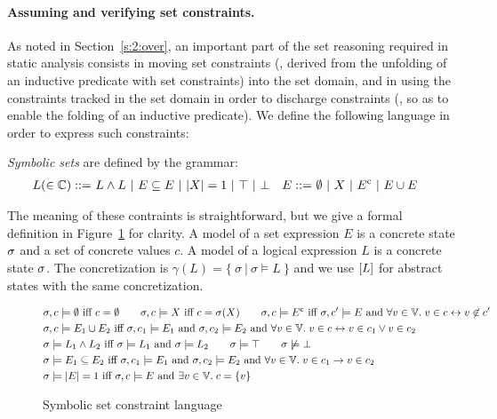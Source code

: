 \paragraph{Assuming and verifying set constraints.}
As noted in Section~\ref{s:2:over}, an important part of the set reasoning
required in static analysis consists in moving set constraints (\eg, derived
from the unfolding of an inductive predicate with set constraints) into the
set domain, and in using the constraints tracked in the set domain in order
to discharge constraints (\eg, so as to enable the folding of an inductive
predicate).
We define the following language in order to express such constraints:
\begin{definition}
  \label{d:1:symsets}
  {\em Symbolic sets} are defined by the grammar:
  \begin{align*}
    L (\in \mathbb{C}) ::=
    & \ L \wedge L \
    | \ E \subseteq E \
    | \ |{X}| = 1 \
    | \ \top \
    | \ \bot
    & E ::=
    & \ \emptyset \ | \ X \ | \ {E}^{\mathrm{c}} \ | \ E \cup E
  \end{align*}
\end{definition}
The meaning of these contraints is straightforward, but we give a formal
definition in Figure~\ref{f:4:symsets} for clarity.
A model of a set expression $E$ is a concrete state $\sigma$ and a set
of concrete values $c$.
A model of a logical expression $L$ is a concrete state $\sigma$.
The concretization is $\gamma(L) = \{\ \sigma \ |\  \sigma \models L\ \}$ and we use $[{L}]$ for abstract states with the same concretization. %
\begin{figure}[t]
  \begin{align*}
    & \sigma, c \models \emptyset \textrm{ iff } c = \emptyset
    \qquad
    \sigma, c \models X \textrm{ iff } c = \sigma(X)
    \qquad \sigma, c \models {E}^{\mathrm{c}}
    \textrm{ iff }
    \sigma, c' \models{E} \textrm{ and } \forall v \in \mathbb{V}.
    \; v \in c \leftrightarrow v \not\in c'
    \\
    & \sigma, c \models E_1 \cup E_2
    \textrm{ iff }
    \sigma, c_1 \models E_1 \textrm{ and } \sigma, c_2 \models E_2
    \textrm{ and }
    \forall v \in \mathbb{V}. \; v \in c \leftrightarrow v \in c_1 \vee
    v \in c_2
    \\
    & \sigma \models L_1 \wedge L_2
    \textrm{ iff }
    \sigma \models L_1 \textrm{ and } \sigma \models L_2 \qquad
    \sigma \models \top \qquad \sigma \not\models \bot
    \\
    & \sigma \models E_1 \subseteq E_2
    \textrm{ iff }
    \sigma, c_1 \models E_1 \textrm{ and } \sigma, c_2 \models E_2
    \textrm{ and } \forall v \in \mathbb{V}. \; v \in c_1 \rightarrow v \in c_2
    \\
    & \sigma \models |{E}| = 1
    \textrm{ iff }
    \sigma, c \models E \textrm{ and } \exists v \in \mathbb{V}. \; c = \{v\}
  \end{align*}
  \caption{Symbolic set constraint language}
  \label{f:4:symsets}
\end{figure}
